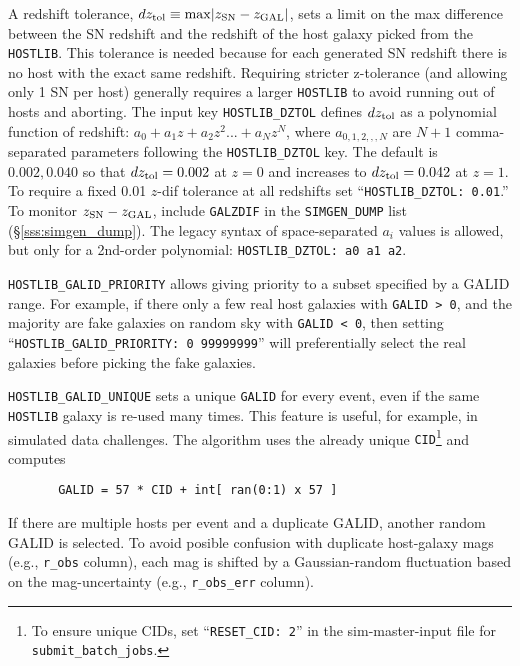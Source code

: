 \documentclass[12pt]{article}
\begin{document}
{\newcommand{\dztol}{dz_{\rm tol}}
A redshift tolerance, 
$\dztol \equiv {\rm max}|z_{\rm SN} - z_{\rm GAL}|$,
sets a limit on the max difference between the SN redshift
and the redshift of the host galaxy picked from the {\tt HOSTLIB}.
This tolerance is needed because for each generated SN redshift there 
is no host with the exact same redshift. Requiring stricter
z-tolerance (and allowing only 1 SN per host) generally
requires a larger {\tt HOSTLIB} to avoid running out of
hosts and aborting. The input key {\tt HOSTLIB\_DZTOL}
defines $\dztol$ as a polynomial function of redshift:
$a_0 + a_1z + a_2z^2 ... + a_Nz^N$, 
where $a_{0,1,2,,,N}$ are $N+1$ comma-separated parameters
following the {\tt HOSTLIB\_DZTOL} key.
The default is $0.002,0.040$ so that
$\dztol=  0.002$ at $z=0$ and increases to $\dztol= 0.042$ at $z=1$.
To require a fixed 0.01 $z$-dif tolerance at all redshifts set
``{\tt HOSTLIB\_DZTOL: 0.01}.''
To monitor $z_{\rm SN} - z_{\rm GAL}$,
include {\tt GALZDIF} in the {\tt SIMGEN\_DUMP} list
(\S\ref{sss:simgen_dump}).
The legacy syntax of space-separated $a_i$ values is allowed,
but only for a 2nd-order polynomial: 
{\tt HOSTLIB\_DZTOL: a0 a1 a2}.

{\tt HOSTLIB\_GALID\_PRIORITY} allows giving priority to a
subset specified by a GALID range. For example, if there only
a few real host galaxies with {\tt GALID > 0}, 
and the majority are fake galaxies on random sky
with {\tt GALID < 0}, then setting 
``{\tt HOSTLIB\_GALID\_PRIORITY: 0 99999999}''  will preferentially
select the real galaxies before picking the fake galaxies.

{\tt HOSTLIB\_GALID\_UNIQUE} sets a unique {\tt GALID} for every event, 
even if the same {\tt HOSTLIB} galaxy is re-used many times. This 
feature is useful, for example, in simulated data challenges.
The algorithm uses the already unique 
{\tt CID}\footnote{To ensure unique CIDs, set ``{\tt RESET\_CID: 2}''
   in the sim-master-input file for {\tt submit\_batch\_jobs}.}
and computes 
\vspace{-0.1in}
\begin{verbatim}
       GALID = 57 * CID + int[ ran(0:1) x 57 ]
\end{verbatim}
\vspace{-0.1in}
If there are multiple hosts per event and a duplicate GALID,
another random GALID is selected. To avoid posible confusion with
duplicate host-galaxy mags (e.g., {\tt r\_obs} column), 
each mag is shifted by a Gaussian-random fluctuation based on the 
mag-uncertainty (e.g., {\tt r\_obs\_err} column).

}
\end{document}
